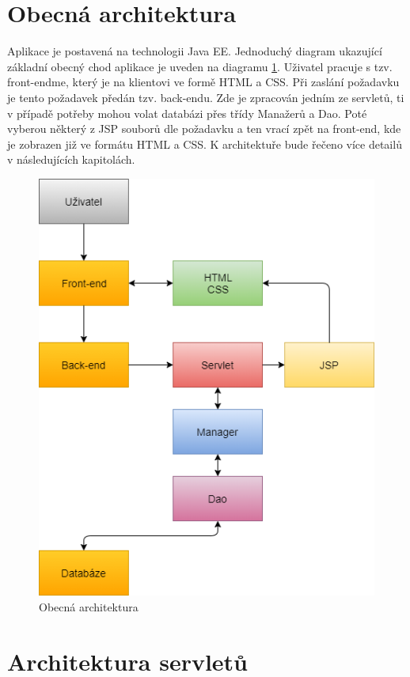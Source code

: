 \documentclass[
12pt,
a4paper,
pdftex,
czech,
titlepage
]{report}
\begin{document}
\section{Obecná architektura}

Aplikace je postavená na technologii Java EE. Jednoduchý diagram ukazující základní obecný chod aplikace je uveden na diagramu \ref{general}. Uživatel pracuje s tzv. front-endme, který je na klientovi ve formě HTML a CSS. Při zaslání požadavku je tento požadavek předán tzv. back-endu. Zde je zpracován jedním ze servletů, ti v případě potřeby mohou volat databázi přes třídy Manažerů a Dao. Poté vyberou některý z JSP souborů dle požadavku a ten vrací zpět na front-end, kde je zobrazen již ve formátu HTML a CSS. K architektuře bude řečeno více detailů v následujících kapitolách.

\begin{figure}[H]
\caption{Obecná architektura}
\label{general}
\includegraphics[width=\textwidth]{general.png}
\end{figure}

\section{Architektura servletů}
\end{document}
